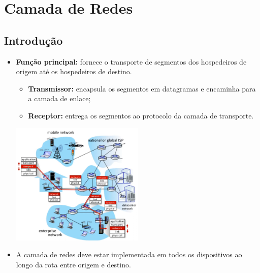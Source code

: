 \section{Camada de Redes}

    \subsection{Introdução}

        \begin{itemize}[left=0.5cm, align=left, nosep]
            
            \item \textbf{Função principal:} fornece o transporte de segmentos dos hospedeiros de origem até os hospedeiros de destino.   
                \begin{itemize}[left=0.5cm, nosep, label=$\hookrightarrow$]
                    \item \textbf{Transmissor:} encapsula os segmentos em datagramas e encaminha para a camada de enlace; 
                    \item \textbf{Receptor:} entrega os segmentos ao protocolo da camada de transporte.
                \end{itemize}     
                
                \begin{center}
                    \includegraphics[width=0.5\textwidth]{img/cap-04/camada-de-redes-introd.png}
                \end{center}
            
            \item A camada de redes deve estar implementada em todos os dispositivos ao longo da rota entre origem e destino.
        
        \end{itemize}

